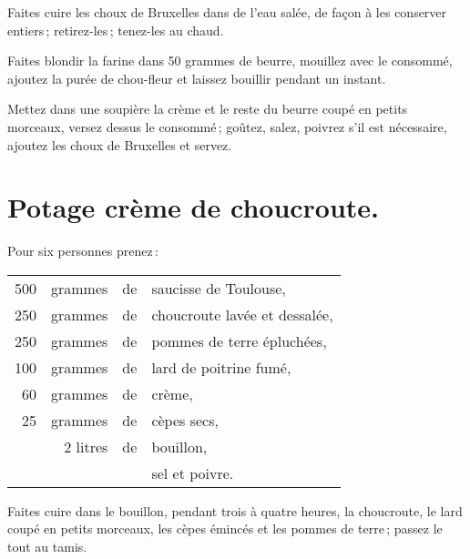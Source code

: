 Faites cuire les choux de Bruxelles dans de l'eau salée, de façon à les
conserver entiers ; retirez-les ; tenez-les au chaud.

Faites blondir la farine dans 50 grammes de beurre, mouillez avec le consommé,
ajoutez la purée de chou-fleur et laissez bouillir pendant un instant.

Mettez dans une soupière la crème et le reste du beurre coupé en petits
morceaux, versez dessus le consommé ; goûtez, salez, poivrez s'il est
nécessaire, ajoutez les choux de Bruxelles et servez.

\section*{\centering Potage crème de choucroute.}

Pour six personnes prenez :

\medskip

\footnotesize
\begin{longtable}{rrrp{16em}}                                                    
    500 & grammes   & de  & saucisse de Toulouse,                                                        \\
    250 & grammes   & de  & choucroute lavée et dessalée,                                                \\
    250 & grammes   & de  & pommes de terre épluchées,                                                   \\
    100 & grammes   & de  & lard de poitrine fumé,                                                       \\
     60 & grammes   & de  & crème,                                                                       \\
     25 & grammes   & de  & cèpes secs,                                                                  \\
        & 2 litres  & de  & bouillon,                                                                    \\
        &           &     & sel et poivre.                                                               \\
\end{longtable}
\normalsize

Faites cuire dans le bouillon, pendant trois à quatre heures, la choucroute, le
lard coupé en petits morceaux, les cèpes émincés et les pommes de terre ;
passez le tout au tamis.

